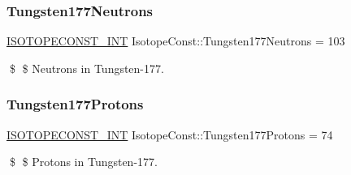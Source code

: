 \subsubsection{\texorpdfstring{Tungsten177\+Neutrons}{Tungsten177Neutrons}}
{\footnotesize\ttfamily \mbox{\hyperlink{group___isotope_const-_macros_ga5f18360b3e99483a35c32d789e62621c}{I\+S\+O\+T\+O\+P\+E\+C\+O\+N\+S\+T\+\_\+\+I\+NT}} Isotope\+Const\+::\+Tungsten177\+Neutrons = 103}

\$ \$ Neutrons in Tungsten-\/177. \mbox{\label{group___isotope_const-_tungsten-_w177_ga7a71f8f22fa59f6a711e720ef12cef14}} 
\subsubsection{\texorpdfstring{Tungsten177\+Protons}{Tungsten177Protons}}
{\footnotesize\ttfamily \mbox{\hyperlink{group___isotope_const-_macros_ga5f18360b3e99483a35c32d789e62621c}{I\+S\+O\+T\+O\+P\+E\+C\+O\+N\+S\+T\+\_\+\+I\+NT}} Isotope\+Const\+::\+Tungsten177\+Protons = 74}

\$ \$ Protons in Tungsten-\/177. 